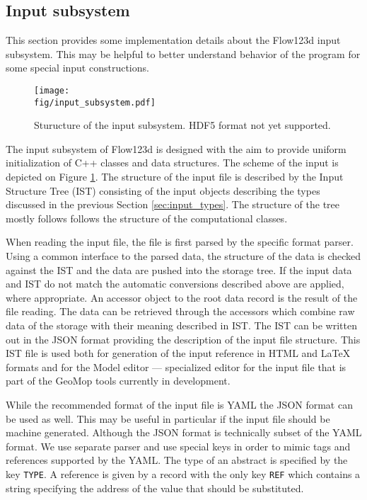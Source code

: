 \subsection{Input subsystem}
This section provides some implementation details about the Flow123d input subsystem. This may be helpful to better understand behavior of the program for 
some special input constructions.

\begin{figure}[b]
 \begin{center}
 \texttt{[image: \\fig/input\_subsystem.pdf]}
 \caption{Sturucture of the input subsystem. HDF5 format not yet supported.}
 \label{fig:input_subsystem}
 \end{center}
\end{figure}

The input subsystem of Flow123d is designed with the aim to provide uniform initialization of 
C++ classes and data structures. The scheme of the input is depicted on Figure \ref{fig:input_subsystem}.
The structure of the input file is described by the Input Structure Tree (IST) consisting of the input objects describing 
the types discussed in the previous Section \ref{sec:input_types}. The structure of the tree mostly follows follows the structure of the computational classes.

When reading the input file, the file is first parsed by the specific format parser. Using a common interface to the parsed data, the 
structure of the data is checked against the IST and the data are pushed into the storage tree. If the input data and IST do not match
the automatic conversions described above are applied, where appropriate.
An accessor object to the root data record is the result of the file reading. The data can be retrieved through the 
accessors which combine raw data of the storage with their meaning described in IST. The IST can be written out in the JSON format
providing the description of the input file structure. This IST file is used both for generation of the input reference in HTML and \LaTeX
formats and for the Model editor --- specialized editor for the input file that is part of the GeoMop tools currently in development.

While the recommended format of the input file is YAML the JSON format can be used as well. This may be useful in particular if the input file
should be machine generated. Although the JSON format is technically subset of the YAML format. We use separate parser and use special keys in order to
mimic tags and references supported by the YAML. The type of an abstract is specified by the key \verb'TYPE'. A reference is given by a record with the only key 
\verb'REF' which contains a string specifying the address of the value that should be substituted.



